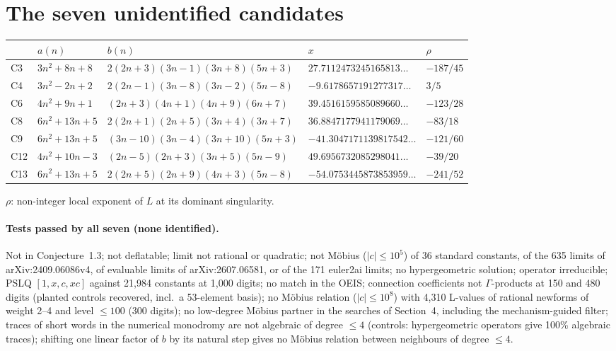 \documentclass[11pt]{article}
\begin{document}
\section{The seven unidentified candidates}
\begin{center}{\small\begin{tabular}{lllll}\toprule
 & $a(n)$ & $b(n)$ & $x$ & $\rho$ \\\midrule
C3 & $3n^2+8n+8$ & $2(2n+3)(3n-1)(3n+8)(5n+3)$ & $27.7112473245165813\ldots$ & $-187/45$\\
C4 & $3n^2-2n+2$ & $2(2n-1)(3n-8)(3n-2)(5n-8)$ & $-9.6178657191277317\ldots$ & $3/5$\\
C6 & $4n^2+9n+1$ & $(2n+3)(4n+1)(4n+9)(6n+7)$ & $39.4516159585089660\ldots$ & $-123/28$\\
C8 & $6n^2+13n+5$ & $2(2n+1)(2n+5)(3n+4)(3n+7)$ & $36.8847177941179069\ldots$ & $-83/18$\\
C9 & $6n^2+13n+5$ & $(3n-10)(3n-4)(3n+10)(5n+3)$ & $-41.3047171139817542\ldots$ & $-121/60$\\
C12 & $4n^2+10n-3$ & $(2n-5)(2n+3)(3n+5)(5n-9)$ & $49.6956732085298041\ldots$ & $-39/20$\\
C13 & $6n^2+13n+5$ & $2(2n+5)(2n+9)(4n+3)(5n-8)$ & $-54.0753445873853959\ldots$ & $-241/52$\\\bottomrule
\end{tabular}}\end{center}
$\rho$: non-integer local exponent of $L$ at its dominant singularity.

{\sloppy\paragraph{Tests passed by all seven (none identified).} Not in Conjecture~1.3; not deflatable; limit not rational or quadratic;
not M\"obius ($|c|\le10^5$) of 36 standard constants, of the 635 limits of arXiv:2409.06086v4, of evaluable limits of arXiv:2607.06581,
or of the 171 euler2ai limits; no hypergeometric solution; operator irreducible; PSLQ $[1,x,c,xc]$ against 21,984 constants at 1,000
digits; no match in the OEIS; connection coefficients not $\Gamma$-products at 150 and 480 digits (planted controls recovered,
incl.\ a 53-element basis); no M\"obius relation ($|c|\le10^8$) with 4,310 L-values of rational newforms of weight 2--4 and level
$\le100$ (300 digits); no low-degree M\"obius partner in the searches of Section~4, including the mechanism-guided filter; traces of short words in the numerical monodromy
are not algebraic of degree $\le4$ (controls: hypergeometric operators give 100\% algebraic traces); shifting one linear factor of
$b$ by its natural step gives no M\"obius relation between neighbours of degree $\le4$.\par}
\end{document}
